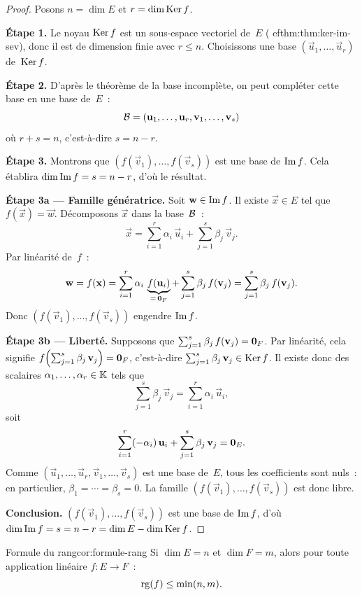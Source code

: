 \begin{proof}
  Posons $n=\dim E$ et $r=\dim\operatorname{Ker} f$.

  \medskip
  \textbf{Étape 1.} Le noyau $\operatorname{Ker} f$ est un sous-espace vectoriel de~$E$
  (
ef{thm:thm:ker-im-sev}), donc il est de dimension finie avec $r\leq n$.
  Choisissons une base $(\vec{u}_1,\ldots,\vec{u}_r)$ de~$\operatorname{Ker} f$.

  \medskip
  \textbf{Étape 2.} D'après le théorème de la base incomplète, on peut
  compléter cette base en une base de~$E$~:
  \[
    {\mathcal{B}}=(\mathbf{u}_1,\ldots,\mathbf{u}_r,\mathbf{v}_1,\ldots,\mathbf{v}_s)
  \]
  où $r+s=n$, c'est-à-dire $s=n-r$.

  \medskip
  \textbf{Étape 3.} Montrons que $(f(\vec{v}_1),\ldots,f(\vec{v}_s))$ est
  une base de $\operatorname{Im} f$. Cela établira $\dim\operatorname{Im} f=s=n-r$, d'où le résultat.

  \medskip
  \textbf{Étape 3a --- Famille génératrice.} Soit $\mathbf{w}\in\operatorname{Im} f$. Il
  existe $\vec{x}\in E$ tel que $f(\vec{x})=\vec{w}$. Décomposons
  $\vec{x}$ dans la base~${\mathcal{B}}$~:
  \[
    \vec{x}=\sum_{i=1}^r\alpha_i\,\vec{u}_i+\sum_{j=1}^s\beta_j\,\vec{v}_j.
  \]
  Par linéarité de~$f$~:
  \[
    \mathbf{w}=f(\mathbf{x})
    =\sum_{i=1}^r\alpha_i\,\underbrace{f(\mathbf{u}_i)}_{=\,\mathbf{0}_F}
     +\sum_{j=1}^s\beta_j\,f(\mathbf{v}_j)
    =\sum_{j=1}^s\beta_j\,f(\mathbf{v}_j).
  \]
  Donc $(f(\vec{v}_1),\ldots,f(\vec{v}_s))$ engendre $\operatorname{Im} f$.

  \medskip
  \textbf{Étape 3b --- Liberté.} Supposons que
  $\sum_{j=1}^s\beta_j\,f(\mathbf{v}_j)=\mathbf{0}_F$. Par linéarité, cela
  signifie $f\!\left(\sum_{j=1}^s\beta_j\,\mathbf{v}_j\right)=\mathbf{0}_F$,
  c'est-à-dire $\sum_{j=1}^s\beta_j\,\mathbf{v}_j\in\operatorname{Ker} f$. Il existe
  donc des scalaires $\alpha_1,\ldots,\alpha_r\in{\mathbb{K}}$ tels que
  \[
    \sum_{j=1}^s\beta_j\,\vec{v}_j
    =\sum_{i=1}^r\alpha_i\,\vec{u}_i,
  \]
  soit
  \[
    \sum_{i=1}^r(-\alpha_i)\,\mathbf{u}_i+\sum_{j=1}^s\beta_j\,\mathbf{v}_j
    =\mathbf{0}_E.
  \]
  Comme $(\vec{u}_1,\ldots,\vec{u}_r,\vec{v}_1,\ldots,\vec{v}_s)$ est
  une base de~$E$, tous les coefficients sont nuls~: en particulier,
  $\beta_1=\cdots=\beta_s=0$. La famille $(f(\vec{v}_1),\ldots,f(\vec{v}_s))$
  est donc libre.

  \medskip
  \textbf{Conclusion.} $(f(\vec{v}_1),\ldots,f(\vec{v}_s))$ est une base
  de $\operatorname{Im} f$, d'où $\dim\operatorname{Im} f=s=n-r=\dim E-\dim\operatorname{Ker} f$.
\end{proof}

\begin{corollary}{Formule du rang}{cor:formule-rang}
  Si $\dim E=n$ et $\dim F=m$, alors pour toute application linéaire
  $f\colon E\to F$~:
  \[
    \operatorname{rg}(f)\leq\min(n,m).
  \]
\end{corollary}

